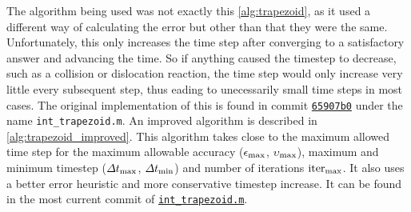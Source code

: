 The algorithm being used was not exactly this \cref{alg:trapezoid}, as it used a different way of calculating the error but other than that they were the same. Unfortunately, this only increases the time step after converging to a satisfactory answer and advancing the time. So if anything caused the timestep to decrease, such as a collision or dislocation reaction, the time step would only increase very little every subsequent step, thus eading to unecessarily small time steps in most cases. The original implementation of this is found in commit \href{https://github.com/TarletonGroup/EasyDD/blob/780a6c41b35687b443d3241674af7393d2140639/int_trapezoid.m}{\texttt{65907b0}} under the name \texttt{int\_trapezoid.m}. An improved algorithm is described in \cref{alg:trapezoid_improved}. This algorithm takes close to the maximum allowed time step for the maximum allowable accuracy ($\epsilon_{\textrm{max}}$, $\upsilon_{\textrm{max}}$), maximum and minimum timestep ($\Delta t_{\textrm{max}}$, $\Delta t_{\textrm{min}}$) and number of iterations $\textrm{iter}_{\textrm{max}}$. It also uses a better error heuristic and more conservative timestep increase. It can be found in the most current commit of \href{https://github.com/TarletonGroup/EasyDD/blob/master/src/int_trapezoid.m}{\texttt{int\_trapezoid.m}}.
